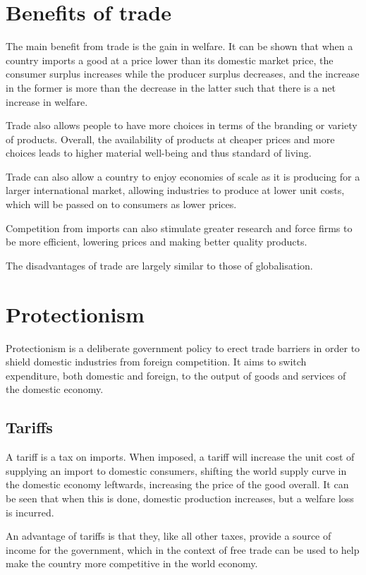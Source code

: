 \documentclass[Economics.tex]{subfiles}
\begin{document}
\section{Benefits of trade}
The main benefit from trade is the gain in welfare. It can be shown that when a country imports a good at a price lower than its domestic market price, the consumer surplus increases while the producer surplus decreases, and the increase in the former is more than the decrease in the latter such that there is a net increase in welfare.

Trade also allows people to have more choices in terms of the branding or variety of products. Overall, the availability of products at cheaper prices and more choices leads to higher material well-being and thus standard of living.

Trade can also allow a country to enjoy economies of scale as it is producing for a larger international market, allowing industries to produce at lower unit costs, which will be passed on to consumers as lower prices.

Competition from imports can also stimulate greater research and force firms to be more efficient, lowering prices and making better quality products.

The disadvantages of trade are largely similar to those of globalisation.
\section{Protectionism}
Protectionism is a deliberate government policy to erect trade barriers in order to shield domestic industries from foreign competition. It aims to switch expenditure, both domestic and foreign, to the output of goods and services of the domestic economy.
\subsection{Tariffs}
A tariff is a tax on imports. When imposed, a tariff will increase the unit cost of supplying an import to domestic consumers, shifting the world supply curve in the domestic economy leftwards, increasing the price of the good overall. It can be seen that when this is done, domestic production increases, but a welfare loss is incurred.

An advantage of tariffs is that they, like all other taxes, provide a source of income for the government, which in the context of free trade can be used to help make the country more competitive in the world economy.
\end{document}
